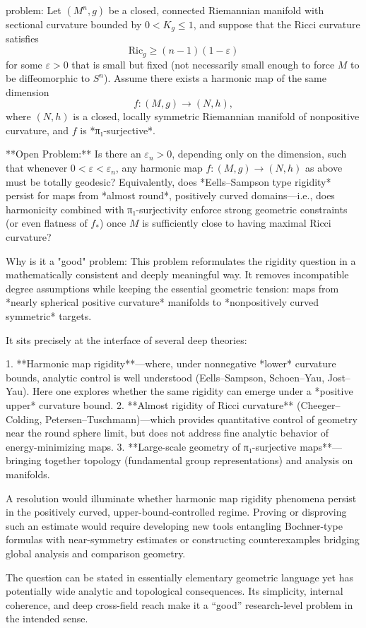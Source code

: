 problem:  
Let \((M^n,g)\) be a closed, connected Riemannian manifold with sectional curvature bounded by \(0 < K_g \le 1\), and suppose that the Ricci curvature satisfies  
\[
\mathrm{Ric}_g \ge (n-1)(1-\varepsilon)
\]
for some \(\varepsilon > 0\) that is small but fixed (not necessarily small enough to force \(M\) to be diffeomorphic to \(S^n\)).  
Assume there exists a harmonic map of the same dimension 
\[
f:(M,g)\to (N,h),
\]
where \((N,h)\) is a closed, locally symmetric Riemannian manifold of nonpositive curvature, and \(f\) is *π₁-surjective*.  

**Open Problem:**  
Is there an \(\varepsilon_n>0\), depending only on the dimension, such that whenever \(0<\varepsilon<\varepsilon_n\), any harmonic map \(f:(M,g)\to (N,h)\) as above must be totally geodesic?  
Equivalently, does *Eells–Sampson type rigidity* persist for maps from *almost round*, positively curved domains—i.e., does harmonicity combined with π₁-surjectivity enforce strong geometric constraints (or even flatness of \(f_*\)) once \(M\) is sufficiently close to having maximal Ricci curvature?

Why is it a "good" problem:  
This problem reformulates the rigidity question in a mathematically consistent and deeply meaningful way. It removes incompatible degree assumptions while keeping the essential geometric tension: maps from *nearly spherical positive curvature* manifolds to *nonpositively curved symmetric* targets.  

It sits precisely at the interface of several deep theories:  

1. **Harmonic map rigidity**—where, under nonnegative *lower* curvature bounds, analytic control is well understood (Eells–Sampson, Schoen–Yau, Jost–Yau). Here one explores whether the same rigidity can emerge under a *positive upper* curvature bound.  
2. **Almost rigidity of Ricci curvature** (Cheeger–Colding, Petersen–Tuschmann)—which provides quantitative control of geometry near the round sphere limit, but does not address fine analytic behavior of energy-minimizing maps.  
3. **Large-scale geometry of π₁-surjective maps**—bringing together topology (fundamental group representations) and analysis on manifolds.  

A resolution would illuminate whether harmonic map rigidity phenomena persist in the positively curved, upper-bound-controlled regime. Proving or disproving such an estimate would require developing new tools entangling Bochner-type formulas with near-symmetry estimates or constructing counterexamples bridging global analysis and comparison geometry.  

The question can be stated in essentially elementary geometric language yet has potentially wide analytic and topological consequences. Its simplicity, internal coherence, and deep cross-field reach make it a “good” research-level problem in the intended sense.